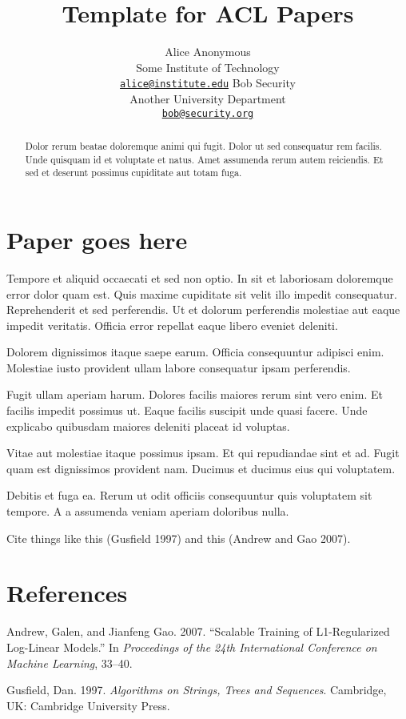 \documentclass[11pt,a4paper]{article}
\title{Template for ACL Papers}
\author{
    Alice Anonymous \\ Some Institute of Technology \\ {\tt \href{mailto:alice@institute.edu}{\nolinkurl{alice@institute.edu}}} \And
    Bob Security \\ Another University Department \\ {\tt \href{mailto:bob@security.org}{\nolinkurl{bob@security.org}}} }
\date{}
\begin{document}
\maketitle
\begin{abstract}
Dolor rerum beatae doloremque animi qui fugit. Dolor ut sed consequatur
rem facilis. Unde quisquam id et voluptate et natus. Amet assumenda
rerum autem reiciendis. Et sed et deserunt possimus cupiditate aut totam
fuga.
\end{abstract}

\section{Paper goes here}\label{paper-goes-here}

Tempore et aliquid occaecati et sed non optio. In sit et laboriosam
doloremque error dolor quam est. Quis maxime cupiditate sit velit illo
impedit consequatur. Reprehenderit et sed perferendis. Ut et dolorum
perferendis molestiae aut eaque impedit veritatis. Officia error
repellat eaque libero eveniet deleniti.

Dolorem dignissimos itaque saepe earum. Officia consequuntur adipisci
enim. Molestiae iusto provident ullam labore consequatur ipsam
perferendis.

Fugit ullam aperiam harum. Dolores facilis maiores rerum sint vero enim.
Et facilis impedit possimus ut. Eaque facilis suscipit unde quasi
facere. Unde explicabo quibusdam maiores deleniti placeat id voluptas.

Vitae aut molestiae itaque possimus ipsam. Et qui repudiandae sint et
ad. Fugit quam est dignissimos provident nam. Ducimus et ducimus eius
qui voluptatem.

Debitis et fuga ea. Rerum ut odit officiis consequuntur quis voluptatem
sit tempore. A a assumenda veniam aperiam doloribus nulla.

Cite things like this (Gusfield 1997) and this (Andrew and Gao 2007).

\section*{References}\label{references}

\hypertarget{refs}{}
\hypertarget{ref-andrew2007scalable}{}
Andrew, Galen, and Jianfeng Gao. 2007. ``Scalable Training of
L1-Regularized Log-Linear Models.'' In \emph{Proceedings of the 24th
International Conference on Machine Learning}, 33--40.

\hypertarget{ref-Gusfield:97}{}
Gusfield, Dan. 1997. \emph{Algorithms on Strings, Trees and Sequences}.
Cambridge, UK: Cambridge University Press.
\end{document}
